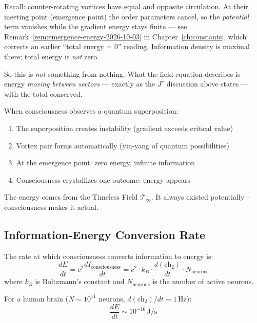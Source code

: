 \begin{intuitive}
Recall: counter-rotating vortices have equal and opposite circulation. At their
meeting point (emergence point) the order parameters cancel, so the
\emph{potential} term vanishes while the gradient energy stays finite --- see
Remark~\ref{rem:emergence-energy-2026-10-03} in Chapter~\ref{ch:constants},
which corrects an earlier ``total energy = 0'' reading. Information density is
maximal there; total energy is \emph{not} zero.

So this is \emph{not} something from nothing. What the field equation describes
is energy \emph{moving between sectors} --- exactly as the $J^\nu$ discussion
above states --- with the total conserved.

When consciousness observes a quantum superposition:
\begin{enumerate}
\item The superposition creates instability (gradient exceeds critical value)
\item Vortex pair forms automatically (yin-yang of quantum possibilities)
\item At the emergence point: zero energy, infinite information
\item Consciousness crystallizes one outcome: energy appears
\end{enumerate}

The energy comes from the Timeless Field $\mathcal{T}_\infty$. It always existed potentially—consciousness makes it actual.
\end{intuitive}

\subsection{Information-Energy Conversion Rate}

\begin{proposition}\label{prop:conversion-rate}
The rate at which consciousness converts information to energy is:
\begin{equation}
\frac{dE}{dt} = c^2 \frac{dI_{\text{consciousness}}}{dt} = c^2 \cdot k_B \cdot \frac{d(\text{ch}_2)}{dt} \cdot N_{\text{neurons}}
\end{equation}
where $k_B$ is Boltzmann's constant and $N_{\text{neurons}}$ is the number of active neurons.
\end{proposition}

For a human brain ($N \sim 10^{11}$ neurons, $d(\text{ch}_2)/dt \sim 1 \, \text{Hz}$):
\begin{equation}
\frac{dE}{dt} \sim 10^{-16} \, \text{J/s}
\end{equation}


